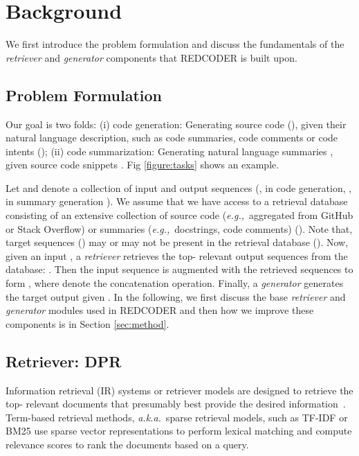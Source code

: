 \documentclass[11pt]{article}
\newcommand{\tool}{{REDCODER}\xspace}
\newcommand{\eg}{\textit{e.g.,}~}
\newcommand{\aka}{\textit{a.k.a.}~}
\begin{document}
 \section{Background}
\label{sec:background}
We first introduce the problem formulation and discuss the fundamentals of the {\em retriever} and {\em generator} components that \tool is built upon.

\subsection{Problem Formulation}
\label{sec:problem-formulation}
Our goal is two folds: (i) code generation: Generating source code (), given their natural language description, such as code summaries, code comments or code intents (); (ii) code summarization: Generating natural language summaries , given source code snippets . Fig \ref{figure:tasks} shows an example.



Let  and  denote a collection of input and output sequences (,  in code generation, ,  in summary generation
). 
We assume that we have access to a retrieval database consisting of an extensive collection of source code (\eg aggregated from GitHub or Stack Overflow) or summaries (\eg docstrings, code comments) (). Note that, target sequences () may or may not be present in the retrieval database ().
Now, given an input , a {\em retriever} retrieves the top- relevant output sequences from the database: .
Then the input sequence  is augmented with the retrieved sequences to form , where  denote the concatenation operation.
Finally, a {\em generator} generates the target output  given .
In the following, we first discuss the base {\em retriever} and {\em generator} modules used in \tool and then how we improve these components is in Section \ref{sec:method}. 



\subsection{Retriever: DPR}
\label{sec:background-retriever}
Information retrieval (IR) systems or retriever models
are designed to retrieve the top- relevant documents that presumably best provide the desired information~\cite{manning2008xml}. 
Term-based retrieval methods, \aka sparse retrieval models, such as TF-IDF or BM25 \cite{robertson2009probabilistic} 
use sparse vector representations to perform lexical matching and compute relevance scores to rank the documents based on a query.
\end{document}
